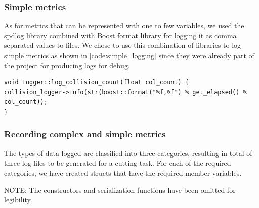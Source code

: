 \subsubsection{Simple metrics}
As for metrics that can be represented with one to few variables, we used the spdlog library combined with Boost format library for logging it as comma separated values to files. We chose to use this combination of libraries to log simple metrics as shown in \autoref{code:simple_logging} since they were already part of the project for producing logs for debug.

\begin{lstlisting}[style=CStyle, caption={Example of simple metrics logging},label={code:simple_logging}]
void Logger::log_collision_count(float col_count) {
collision_logger->info(str(boost::format("%f,%f") % get_elapsed() % col_count));
}
\end{lstlisting}

\subsubsection{Recording complex and simple metrics}
The types of data logged are classified into three categories, resulting in total of three log files to be generated for a cutting task. For each of the required categories, we have created structs that have the required member variables.

NOTE: The constructors and serialization functions have been omitted for legibility.

